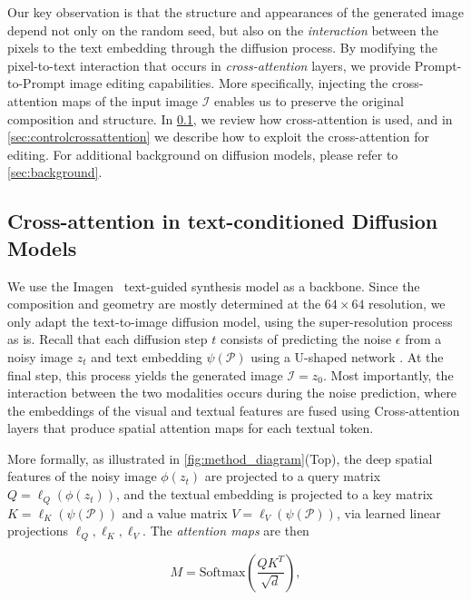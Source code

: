 Our key observation is that the structure and appearances of the generated image depend not only on the random seed, but also on the \emph{interaction} between the pixels to the text embedding through the diffusion process. By modifying the pixel-to-text interaction that occurs in \emph{cross-attention} layers, we provide Prompt-to-Prompt image editing capabilities. More specifically, injecting the cross-attention maps of the input image $\mathcal{I}$ enables us to preserve the original composition and structure. In \ref{sec:crossattentiontext}, we review how cross-attention is used, and in \ref{sec:controlcrossattention} we describe how to exploit the cross-attention for editing. For additional background on diffusion models, please refer to \ref{sec:background}.

\subsection{Cross-attention in text-conditioned Diffusion Models}\label{sec:crossattentiontext}

We use the Imagen~\cite{saharia2022photorealistic} text-guided synthesis model as a backbone. Since the composition and geometry are mostly determined at the $64 \times 64$ resolution, we only adapt the text-to-image diffusion model, using the super-resolution process as is. Recall that each diffusion step $t$ consists of predicting the noise $\epsilon$ from a noisy image $z_t$ and text embedding $\psi(\mathcal{P})$ using a U-shaped network \cite{ronneberger2015u}. At the final step, this process yields the generated image $\mathcal{I}=z_0$. 
Most importantly, the interaction between the two modalities occurs during the noise prediction, where the embeddings of the visual and textual features are fused using Cross-attention layers that produce spatial attention maps for each textual token.

More formally, as illustrated in \ref{fig:method_diagram}(Top),  the deep spatial features of the noisy image $\phi(z_t)$ are projected to a query matrix $Q = \ell_Q(\phi(z_t))$, and the textual embedding is projected to a key matrix $K = \ell_K(\psi(\mathcal{P}))$ and a value matrix $V = \ell_V(\psi(\mathcal{P}))$, via learned linear projections $\ell_Q, \ell_K, \ell_V$.
The \textit{attention maps} are then

\begin{equation}
M=\text{Softmax}\left(\frac{QK^T}{\sqrt{d}}\right),
\end{equation}

